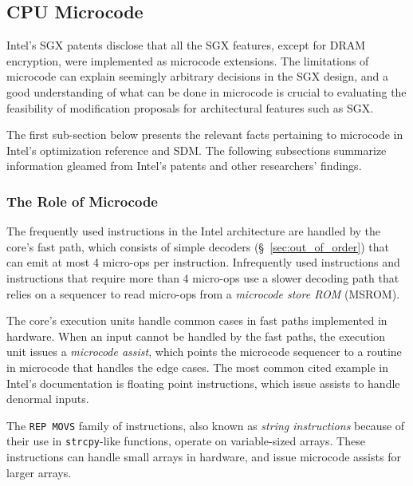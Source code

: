 \subsection{CPU Microcode}
\label{sec:microcode}

Intel's SGX patents disclose that all the SGX features, except for DRAM
encryption, were implemented as microcode extensions. The limitations of
microcode can explain seemingly arbitrary decisions in the SGX design, and a
good understanding of what can be done in microcode is crucial to evaluating
the feasibility of modification proposals for architectural features such as
SGX.

The first sub-section below presents the relevant facts pertaining to microcode
in Intel's optimization reference \cite{intel2014optimization} and SDM. The
following subsections summarize information gleamed from Intel's patents and
other researchers' findings.


\subsubsection{The Role of Microcode}
\label{sec:microcode_role}


The frequently used instructions in the Intel architecture are handled by the
core's fast path, which consists of simple decoders (\S~\ref{sec:out_of_order})
that can emit at most 4 micro-ops per instruction. Infrequently used
instructions and instructions that require more than 4 micro-ops use a slower
decoding path that relies on a sequencer to read micro-ops from a
\textit{microcode store ROM} (MSROM).


The core's execution units handle common cases in fast paths implemented in
hardware. When an input cannot be handled by the fast paths, the execution
unit issues a \textit{microcode assist}, which points the microcode sequencer
to a routine in microcode that handles the edge cases. The most common cited
example in Intel's documentation is floating point instructions, which issue
assists to handle denormal inputs.

The \texttt{REP MOVS} family of instructions, also known as \textit{string
instructions} because of their use in \texttt{strcpy}-like functions, operate
on variable-sized arrays. These instructions can handle small arrays in
hardware, and issue microcode assists for larger arrays.

